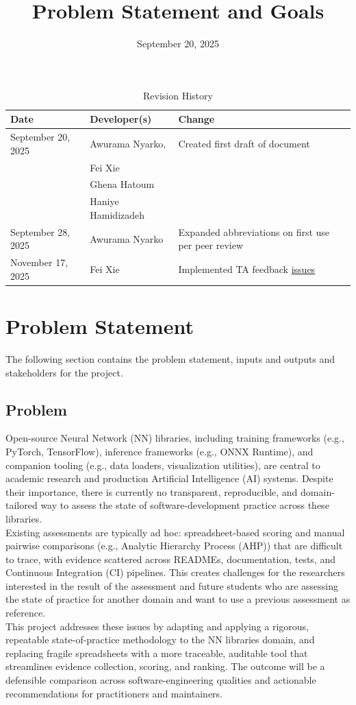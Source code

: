 \documentclass{article}
\title{Problem Statement and Goals\\\progname}
\author{\authname}
\date{September 20, 2025}
\begin{document}
\maketitle

\begin{table}[hp]
\caption{Revision History} \label{TblRevisionHistory}
\begin{tabularx}{\textwidth}{llX}
\toprule
\textbf{Date} & \textbf{Developer(s)} & \textbf{Change}\\
\midrule
September 20, 2025 & Awurama Nyarko, & Created first draft of document
 \\ & Fei Xie &
 \\ &Ghena Hatoum &
 \\ &Haniye Hamidizadeh &
 \\
September 28, 2025 & Awurama Nyarko & Expanded abbreviations on first use per peer review \\
November 17, 2025 & Fei Xie & Implemented TA feedback \href{https://github.com/thaafei/DomainX/issues/52}{issues}\\
\bottomrule
\end{tabularx}
\end{table}

\section{Problem Statement}
The following section contains the problem statement, inputs and outputs and stakeholders for the project.
\subsection{Problem}
Open-source Neural Network (NN) libraries, including training frameworks (e.g., PyTorch, TensorFlow), inference frameworks (e.g., ONNX Runtime), and companion tooling (e.g., data loaders, visualization utilities), are central to academic research and production Artificial Intelligence (AI) systems.
Despite their importance, there is currently no transparent, reproducible, and domain-tailored way to assess the state of software-development practice across these libraries.
\\Existing assessments are typically ad hoc: spreadsheet-based scoring and manual pairwise comparisons (e.g., Analytic Hierarchy Process (AHP)) that are difficult to trace, with evidence scattered across READMEs, documentation, tests, and Continuous Integration (CI) pipelines.
This creates challenges for the researchers interested in the result of the assessment and future students who are assessing the state of practice for another domain and want to use a previous assessment as reference.
\\This project addresses these issues by adapting and applying a rigorous, repeatable state-of-practice methodology to the NN libraries domain,
and replacing fragile spreadsheets with a more traceable, auditable tool that streamlines evidence collection, scoring, and ranking.
The outcome will be a defensible comparison across software-engineering qualities and actionable recommendations for practitioners and maintainers.
\end{document}
